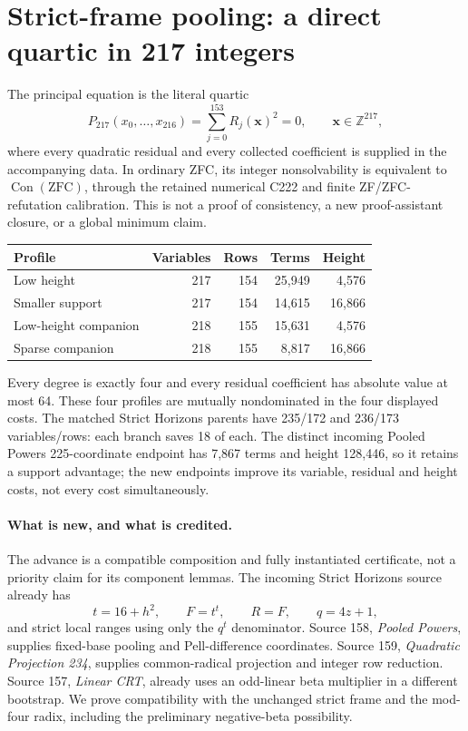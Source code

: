 \section{Strict-frame pooling: a direct quartic in 217 integers}
\label{sec:r21-integer}

The principal equation is the literal quartic
\[
 P_{217}(x_0,\ldots,x_{216})=\sum_{j=0}^{153}R_j(\boldsymbol x)^2=0,
 \qquad \boldsymbol x\in\mathbb Z^{217},
\]
where every quadratic residual and every collected coefficient is supplied
in the accompanying data. In ordinary ZFC, its integer nonsolvability is
equivalent to $\operatorname{Con}(\mathrm{ZFC})$, through the retained
numerical C222 and finite ZF/ZFC-refutation calibration. This is not a proof
of consistency, a new proof-assistant closure, or a global minimum claim.

\begin{center}
\begin{tabular}{lrrrr}
\toprule
Profile & Variables & Rows & Terms & Height\\
\midrule
Low height &217&154&25,949&4,576\\
Smaller support &217&154&14,615&16,866\\
Low-height companion &218&155&15,631&4,576\\
Sparse companion &218&155&8,817&16,866\\
\bottomrule
\end{tabular}
\end{center}
Every degree is exactly four and every residual coefficient has absolute
value at most 64. These four profiles are mutually nondominated in the
four displayed costs. The matched Strict Horizons parents have 235/172
and 236/173 variables/rows: each branch saves 18 of each. The distinct
incoming Pooled Powers 225-coordinate endpoint has 7,867 terms and
height 128,446, so it retains a support advantage; the new endpoints improve
its variable, residual and height costs, not every cost simultaneously.

\paragraph{What is new, and what is credited.}
The advance is a compatible composition and fully instantiated certificate,
not a priority claim for its component lemmas. The incoming Strict Horizons
source already has
\[
 t=16+h^2,\qquad F=t^t,\qquad R=F,\qquad q=4z+1,
\]
and strict local ranges using only the $q^t$ denominator.
Source 158, \emph{Pooled Powers}, supplies fixed-base pooling and
Pell-difference coordinates. Source 159, \emph{Quadratic Projection 234},
supplies common-radical projection and integer row reduction. Source 157,
\emph{Linear CRT}, already uses an odd-linear beta multiplier in a different
bootstrap. We prove compatibility with the unchanged strict frame and the
mod-four radix, including the preliminary negative-beta possibility.

